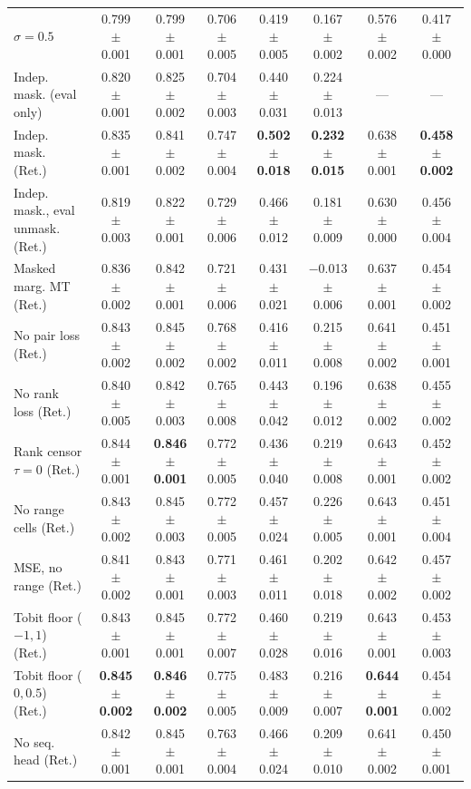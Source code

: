 \begin{table}[H]
{\begin{tabular}{lccccccc}
$\sigma=0.5$ & 0.799 $\pm$ 0.001 & 0.799 $\pm$ 0.001 & 0.706 $\pm$ 0.005 & 0.419 $\pm$ 0.005 & 0.167 $\pm$ 0.002 & 0.576 $\pm$ 0.002 & 0.417 $\pm$ 0.000 \\
Indep. mask. (eval only) & 0.820 $\pm$ 0.001 & 0.825 $\pm$ 0.002 & 0.704 $\pm$ 0.003 & 0.440 $\pm$ 0.031 & 0.224 $\pm$ 0.013 & --- & --- \\
Indep. mask. (Ret.) & 0.835 $\pm$ 0.001 & 0.841 $\pm$ 0.002 & 0.747 $\pm$ 0.004 & \textbf{0.502 $\pm$ 0.018} & \textbf{0.232 $\pm$ 0.015} & 0.638 $\pm$ 0.001 & \textbf{0.458 $\pm$ 0.002} \\
Indep. mask., eval unmask. (Ret.) & 0.819 $\pm$ 0.003 & 0.822 $\pm$ 0.001 & 0.729 $\pm$ 0.006 & 0.466 $\pm$ 0.012 & 0.181 $\pm$ 0.009 & 0.630 $\pm$ 0.000 & 0.456 $\pm$ 0.004 \\
Masked marg. MT (Ret.) & 0.836 $\pm$ 0.002 & 0.842 $\pm$ 0.001 & 0.721 $\pm$ 0.006 & 0.431 $\pm$ 0.021 & $-$0.013 $\pm$ 0.006 & 0.637 $\pm$ 0.001 & 0.454 $\pm$ 0.002 \\
No pair loss (Ret.) & 0.843 $\pm$ 0.002 & 0.845 $\pm$ 0.002 & 0.768 $\pm$ 0.002 & 0.416 $\pm$ 0.011 & 0.215 $\pm$ 0.008 & 0.641 $\pm$ 0.002 & 0.451 $\pm$ 0.001 \\
No rank loss (Ret.) & 0.840 $\pm$ 0.005 & 0.842 $\pm$ 0.003 & 0.765 $\pm$ 0.008 & 0.443 $\pm$ 0.042 & 0.196 $\pm$ 0.012 & 0.638 $\pm$ 0.002 & 0.455 $\pm$ 0.002 \\
Rank censor $\tau=0$ (Ret.) & 0.844 $\pm$ 0.001 & \textbf{0.846 $\pm$ 0.001} & 0.772 $\pm$ 0.005 & 0.436 $\pm$ 0.040 & 0.219 $\pm$ 0.008 & 0.643 $\pm$ 0.001 & 0.452 $\pm$ 0.002 \\
No range cells (Ret.) & 0.843 $\pm$ 0.002 & 0.845 $\pm$ 0.003 & 0.772 $\pm$ 0.005 & 0.457 $\pm$ 0.024 & 0.226 $\pm$ 0.005 & 0.643 $\pm$ 0.001 & 0.451 $\pm$ 0.004 \\
MSE, no range (Ret.) & 0.841 $\pm$ 0.002 & 0.843 $\pm$ 0.001 & 0.771 $\pm$ 0.003 & 0.461 $\pm$ 0.011 & 0.202 $\pm$ 0.018 & 0.642 $\pm$ 0.002 & 0.457 $\pm$ 0.002 \\
Tobit floor ($-1, 1$) (Ret.) & 0.843 $\pm$ 0.001 & 0.845 $\pm$ 0.001 & 0.772 $\pm$ 0.007 & 0.460 $\pm$ 0.028 & 0.219 $\pm$ 0.016 & 0.643 $\pm$ 0.001 & 0.453 $\pm$ 0.003 \\
Tobit floor ($0, 0.5$) (Ret.) & \textbf{0.845 $\pm$ 0.002} & \textbf{0.846 $\pm$ 0.002} & 0.775 $\pm$ 0.005 & 0.483 $\pm$ 0.009 & 0.216 $\pm$ 0.007 & \textbf{0.644 $\pm$ 0.001} & 0.454 $\pm$ 0.002 \\
No seq. head (Ret.) & 0.842 $\pm$ 0.001 & 0.845 $\pm$ 0.001 & 0.763 $\pm$ 0.004 & 0.466 $\pm$ 0.024 & 0.209 $\pm$ 0.010 & 0.641 $\pm$ 0.002 & 0.450 $\pm$ 0.001 \\

\end{tabular}}
\end{table}

